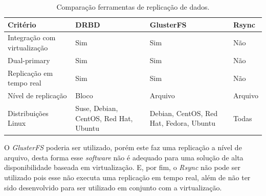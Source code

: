 \begin{table}[h!]
\caption{Comparação ferramentas de replicação de dados.}
\label{tab:replicacao}
\begin{center}
\begin{tabular}{|l|p{3.5cm}|p{3.5cm}|p{2cm}|}\hline
\textbf{Critério} & \textbf{DRBD} & \textbf{GlusterFS} & \textbf{Rsync} \\\hline
Integração com virtualização & Sim & Sim & Não \\\hline
Dual-primary & Sim & Sim & Não \\\hline
Replicação em tempo real & Sim & Sim & Não \\\hline
Nível de replicação & Bloco & Arquivo & Arquivo \\\hline
Distribuições Linux & Suse, Debian, CentOS, Red Hat, Ubuntu & Debian, CentOS, Red Hat, Fedora, Ubuntu & Todas \\\hline
\end{tabular}
\end{center}
\end{table}

O \textit{GlusterFS} poderia ser utilizado, porém este faz uma replicação a nível de arquivo, desta forma esse \textit{software} não é adequado 
para uma solução de alta disponibilidade baseada em virtualização. E, por fim, o \textit{Rsync} não pode ser utilizado pois esse não executa 
uma replicação em tempo real, além de não ter sido desenvolvido para ser utilizado em conjunto com a virtualização.





